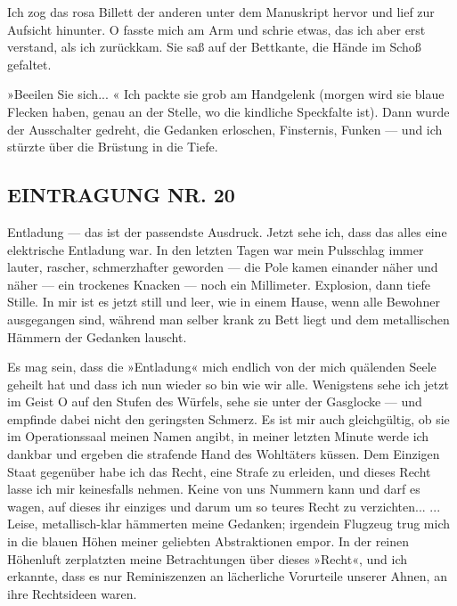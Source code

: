 Ich zog das rosa Billett der anderen unter dem Manuskript hervor
und lief zur Aufsicht hinunter. O fasste mich am Arm und schrie
etwas, das ich aber erst verstand, als ich zurückkam. Sie saß auf
der Bettkante, die Hände im Schoß gefaltet.

»Beeilen Sie sich... « Ich packte sie grob am Handgelenk (morgen
wird sie blaue Flecken haben, genau an der Stelle, wo die kindliche
Speckfalte ist). Dann wurde der Ausschalter gedreht, die Gedanken
erloschen, Finsternis, Funken — und ich stürzte über die Brüstung
in die Tiefe.

\subsection{EINTRAGUNG NR. 20}

Entladung — das ist der passendste Ausdruck. Jetzt sehe ich, dass
das alles eine elektrische Entladung war. In den letzten Tagen war
mein Pulsschlag immer lauter, rascher, schmerzhafter geworden — die
Pole kamen einander näher und näher — ein trockenes Knacken — noch
ein Millimeter. Explosion, dann tiefe Stille. In mir ist es jetzt
still und leer, wie in einem Hause, wenn alle Bewohner ausgegangen
sind, während man selber krank zu Bett liegt und dem metallischen
Hämmern der Gedanken lauscht.

Es mag sein, dass die »Entladung« mich endlich von der mich
quälenden Seele geheilt hat und dass ich nun wieder so bin wie wir
alle. Wenigstens sehe ich jetzt im Geist O auf den Stufen des
Würfels, sehe sie unter der Gasglocke — und empfinde dabei nicht
den geringsten Schmerz. Es ist mir auch gleichgültig, ob sie im
Operationssaal meinen Namen angibt, in meiner letzten Minute werde
ich dankbar und ergeben die strafende Hand des Wohltäters küssen.
Dem Einzigen Staat gegenüber habe ich das Recht, eine Strafe zu
erleiden, und dieses Recht lasse ich mir keinesfalls nehmen. Keine
von uns Nummern kann und darf es wagen, auf dieses ihr einziges und
darum um so teures Recht zu verzichten... ... Leise,
metallisch-klar hämmerten meine Gedanken; irgendein Flugzeug trug
mich in die blauen Höhen meiner geliebten Abstraktionen empor. In
der reinen Höhenluft zerplatzten meine Betrachtungen über dieses
»Recht«, und ich erkannte, dass es nur Reminiszenzen an lächerliche
Vorurteile unserer Ahnen, an ihre Rechtsideen waren.

